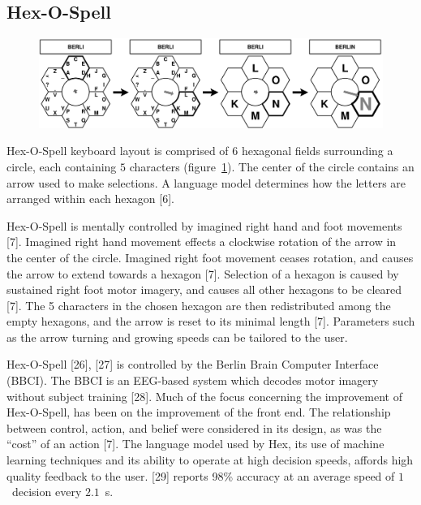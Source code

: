 \documentclass[12pt,titlepage]{article}
\begin{document}
\subsection{Hex-O-Spell}

\begin{figure}[t]
\begin{center}
	\includegraphics[scale=0.10]{figure3.jpeg}
	\label{fig:Hex}
\end{center}
\end{figure}

Hex-O-Spell keyboard layout is comprised of $6$ hexagonal fields surrounding a circle, each containing 
$5$ characters (figure~\ref{fig:Hex}).  The center of the circle contains an arrow used to make selections.  A language 
model determines how the letters are arranged within each hexagon [6].

Hex-O-Spell is mentally controlled by imagined right hand and foot movements [7].  Imagined right 
hand movement effects a clockwise rotation of the arrow in the center of the circle.  Imagined right foot 
movement ceases rotation, and causes the arrow to extend towards a hexagon [7].  Selection of a 
hexagon is caused by sustained right foot motor imagery, and causes all other hexagons to be 
cleared [7].  The 5 characters in the chosen hexagon are then redistributed among the empty hexagons, 
and the arrow is reset to its minimal length [7].  Parameters such as the arrow turning and growing 
speeds can be tailored to the user.

Hex-O-Spell [26], [27] is controlled by the Berlin Brain Computer Interface (BBCI).  The BBCI is an EEG-based
system which decodes motor imagery without subject training [28].  Much of the  focus 
concerning the improvement of Hex-O-Spell, has been on the improvement of the front end.  The 
relationship between control, action, and belief were considered in its design, as was the ``cost'' of an 
action [7].  The language model used by Hex,  its use of machine learning techniques and its ability to 
operate at high decision speeds, affords high quality feedback to the user. [29] reports 98\% accuracy at 
an average speed of $1$~decision every  $2.1$~s.
\end{document}

